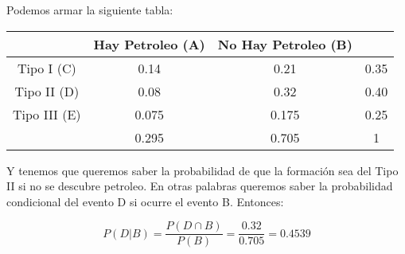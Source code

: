\documentclass{article}
\newcommand{\prob}[1]{{P} \left( {#1} \right)}
\begin{document}
Podemos armar la siguiente tabla:
\begin{table}[ht]
\begin{tabular}{|c|c|c|c|} \hline
	             & Hay Petroleo (A)  & No Hay Petroleo (B) &  \\ \hline
	Tipo I   (C) & 0.14          & 0.21  & 0.35 \\ 
	Tipo II  (D) & 0.08          & 0.32  & 0.40 \\ 
	Tipo III (E) & 0.075         & 0.175 & 0.25 \\ \hline
	             & 0.295         & 0.705 & 1  \\ \hline
\end{tabular}
\end{table}

\vspace{0.2cm}
Y tenemos que queremos saber la probabilidad de que la formación sea del Tipo II si no se descubre petroleo. En
otras palabras queremos saber la probabilidad condicional del evento D si ocurre el evento B. Entonces:

\begin{equation*}
	\prob{D | B} = \frac{\prob{D \cap B}}{\prob{B}} = \frac{0.32}{0.705} = 0.4539
\end{equation*}
\end{document}
